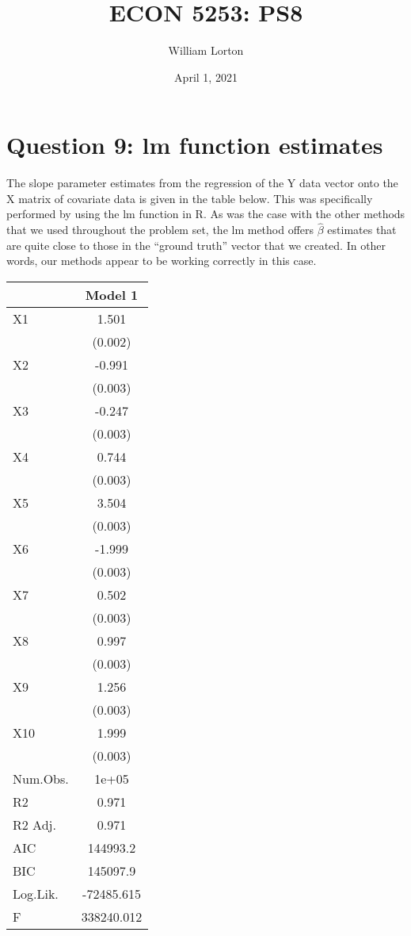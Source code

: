 \documentclass{article}
\title{ECON 5253: PS8}
\author{William Lorton}
\date{April 1, 2021}
\begin{document}
\maketitle

\section{Question 9: lm function estimates}

The slope parameter estimates from the regression of the Y data vector onto the X matrix of covariate data is given in the table below. This was specifically performed by using the lm function in R. As was the case with the other methods that we used throughout the problem set, the lm method offers \(\hat{\beta}\) estimates that are quite close to those in the ``ground truth'' vector that we created. In other words, our methods appear to be working correctly in this case.

\begin{table}
\centering
\begin{tabular}[t]{lc}
\toprule
  & Model 1\\
\midrule
X1 & 1.501\\
 & (0.002)\\
X2 & -0.991\\
 & \vphantom{8} (0.003)\\
X3 & -0.247\\
 & \vphantom{7} (0.003)\\
X4 & 0.744\\
 & \vphantom{6} (0.003)\\
X5 & 3.504\\
 & \vphantom{5} (0.003)\\
X6 & -1.999\\
 & \vphantom{4} (0.003)\\
X7 & 0.502\\
 & \vphantom{3} (0.003)\\
X8 & 0.997\\
 & \vphantom{2} (0.003)\\
X9 & 1.256\\
 & \vphantom{1} (0.003)\\
X10 & 1.999\\
 & (0.003)\\
\midrule
Num.Obs. & 1e+05\\
R2 & 0.971\\
R2 Adj. & 0.971\\
AIC & 144993.2\\
BIC & 145097.9\\
Log.Lik. & -72485.615\\
F & 338240.012\\
\bottomrule
\end{tabular}
\end{table}
\end{document}
